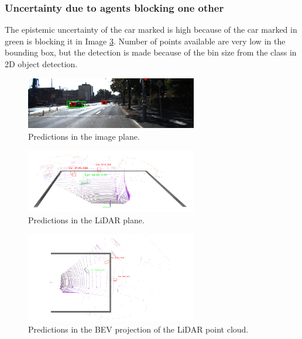 \documentclass[10pt,twocolumn,letterpaper]{article}
\begin{document}
\subsubsection{Uncertainty due to agents blocking one other}
The epistemic uncertainty of the car marked is high because of the car marked in green is blocking it in Image \ref{fig:Uncert_blockage-1}. Number of points available are very low in the bounding box, but the detection is made because of the bin size from the class in 2D object detection.
\begin{figure}[!htbp]
        \centering
		\includegraphics[width=75mm, scale = 0.4]{images/Uncertainty_results/3461_overlap_bbox.png}
        \caption[Extracted frustum point cloud after Normalization]{Predictions in the image plane.}
        \label{fig:Uncert_blockage-1}
\end{figure}
\begin{figure}[!htbp]
        \centering
		\includegraphics[width=75mm, scale = 0.4]{images/Uncertainty_results/3461_Follow_cam_view.png}
        \caption[Extracted frustum point cloud after Normalization]{Predictions in the LiDAR plane.}
        \label{fig:Uncert_blockage-1}
\end{figure}
\begin{figure}[!htbp]
        \centering
		\includegraphics[width=75mm,scale = 0.4]{images/Uncertainty_results/3461_overlap.png}
        \caption[Extracted frustum point cloud after Normalization]{Predictions in the BEV projection of the LiDAR point cloud.}
        \label{fig:Uncert_blockage-1}
\end{figure}
\end{document}
